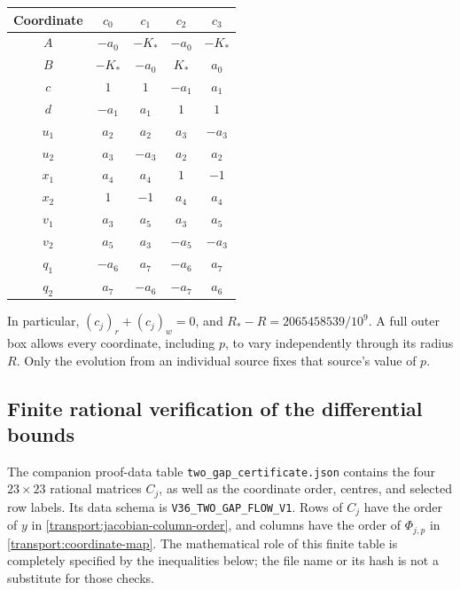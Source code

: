 \documentclass[11pt,reqno]{amsart}
\theoremstyle{definition}
\theoremstyle{remark}
\begin{document}
\begin{center}
\begin{minipage}{\linewidth}
\centering
\makeatletter{}\makeatother
\caption{The remaining coordinates of the four rational centres.}
\label{transport:centre-table}
\begin{tabular}{ccccc}
\toprule
Coordinate & \(c_0\) & \(c_1\) & \(c_2\) & \(c_3\)\\
\midrule
\(A\) & \(-a_0\)&\(-K_*\)&\(-a_0\)&\(-K_*\)\\
\(B\) & \(-K_*\)&\(-a_0\)&\(K_*\)&\(a_0\)\\
\(c\) & \(1\)&\(1\)&\(-a_1\)&\(a_1\)\\
\(d\) & \(-a_1\)&\(a_1\)&\(1\)&\(1\)\\
\(u_1\) & \(a_2\)&\(a_2\)&\(a_3\)&\(-a_3\)\\
\(u_2\) & \(a_3\)&\(-a_3\)&\(a_2\)&\(a_2\)\\
\(x_1\) & \(a_4\)&\(a_4\)&\(1\)&\(-1\)\\
\(x_2\) & \(1\)&\(-1\)&\(a_4\)&\(a_4\)\\
\(v_1\) & \(a_3\)&\(a_5\)&\(a_3\)&\(a_5\)\\
\(v_2\) & \(a_5\)&\(a_3\)&\(-a_5\)&\(-a_3\)\\
\(q_1\) & \(-a_6\)&\(a_7\)&\(-a_6\)&\(a_7\)\\
\(q_2\) & \(a_7\)&\(-a_6\)&\(-a_7\)&\(a_6\)\\
\bottomrule
\end{tabular}
\end{minipage}
\end{center}
In particular, \((c_j)_r+(c_j)_w=0\), and
\(R_*-R=2065458539/10^9\).  A full outer box allows every coordinate,
including \(p\), to vary independently through its radius \(R\).
Only the evolution from an individual source fixes that source's
value of \(p\).

\subsection{Finite rational verification of the differential bounds}
\label{transport:rational-verification}
The companion proof-data table \texttt{two\_gap\_certificate.json}
contains the four \(23\times23\) rational matrices \(C_j\), as well
as the coordinate order, centres, and selected row labels.  Its data
schema is \texttt{V36\_TWO\_GAP\_FLOW\_V1}.  Rows of \(C_j\)
have the order of \(y\) in
\eqref{transport:jacobian-column-order}, and columns have the order of
\(\Phi_{j,p}\) in \eqref{transport:coordinate-map}.  The mathematical
role of this finite table is completely specified by the inequalities
below; the file name or its hash is not a substitute for those checks.
\end{document}
